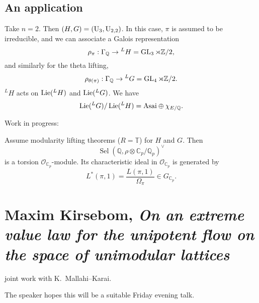 \documentclass[reqno]{amsart} 
\numberwithin{theorem}{section}
\numberwithin{equation}{section}
\begin{document}
\subsection{An application}

Take $n = 2$.  Then $(H, G) =(\operatorname{U}_3, \operatorname{U}_{2, 2})$.  In this case, $\pi$ is assumed to be irreducible, and we can associate a Galois representation
\begin{equation*}
  \rho_\pi : \Gamma_{\mathbb{Q}} \rightarrow {}^L H = \operatorname{GL}_3 \rtimes \mathbb{Z} /2,
\end{equation*}
and similarly for the theta lifting,
\begin{equation*}
  \rho_{\theta(\pi)} : \Gamma_{\mathbb{Q}} \rightarrow {}^L G = \operatorname{GL}_4 \rtimes \mathbb{Z} /2.
\end{equation*}
${}^L H$ acts on $\operatorname{Lie}({}^L H)$ and $\operatorname{Lie}({}^L G)$.  We have
\begin{equation*}
  \operatorname{Lie}({}^L G) / \operatorname{Lie}({}^L H) = \mathrm{Asai} \oplus \chi_{E/\mathbb{Q}}.
\end{equation*}

Work in progress:
\begin{theorem}[Z, '24]
  Assume modularity lifting theorems ($R = \mathbb{T}$) for $H$ and $G$.  Then
  \begin{equation*}
    \operatorname{Sel}(\mathbb{Q},
    \rho \otimes 
    \mathbb{C}_p / \mathbb{Q}_p
    )^\vee
  \end{equation*}
  is a torsion $\mathcal{O}_{\mathbb{C}_p}$-module.  Its characteristic ideal in $\mathcal{O}_{\mathbb{C}_p}$ is generated by
  \begin{equation*}
    L^\ast(\pi, 1)
    = \frac{L(\pi, 1)}{\Omega_\pi} \in G_{\mathbb{C}_p}.
  \end{equation*}
\end{theorem}


\section{Maxim Kirsebom, \emph{On an extreme value law for the unipotent flow on the space of unimodular lattices}}

joint work with K.\ Mallahi--Karai.  \cite{2022arXiv2209.07283}

The speaker hopes this will be a suitable Friday evening talk.
\end{document}
